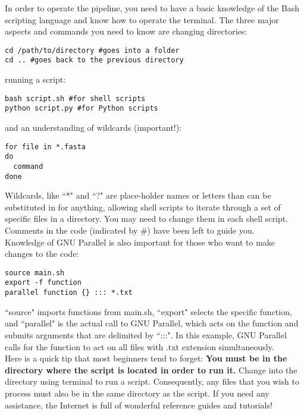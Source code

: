 \documentclass[12pt,titlepage]{article}
\begin{document}
In order to operate the pipeline, you need to have a basic knowledge of the Bash scripting language and know how to operate the terminal. The three major aspects and commands you need to know are changing directories:
\begin{tcolorbox}
\begin{lstlisting}
cd /path/to/directory #goes into a folder
cd .. #goes back to the previous directory 
\end{lstlisting}
\end{tcolorbox}
\noindent running a script:
\begin{tcolorbox}
\begin{lstlisting}
bash script.sh #for shell scripts
python script.py #for Python scripts
\end{lstlisting}
\end{tcolorbox}
\noindent and an understanding of wildcards (important!):
\begin{tcolorbox}
\begin{lstlisting}
for file in *.fasta
do
  command
done
\end{lstlisting}
\end{tcolorbox}
\noindent Wildcards, like ``*" and ``?" are place-holder names or letters than can be substituted in for anything, allowing shell scripts to iterate through a set of specific files in a directory. You may need to change them in each shell script. Comments in the code (indicated by \#) have been left to guide you.\\

Knowledge of GNU Parallel is also important for those who want to make changes to the code:
\begin{tcolorbox}
\begin{lstlisting}
source main.sh	
export -f function 
parallel function {} ::: *.txt 
\end{lstlisting}
\end{tcolorbox}
\noindent ``source" imports functions from main.sh, ``export" selects the specific function, and ``parallel" is the actual call to GNU Parallel, which acts on the function and submits arguments that are delimited by ``:::". In this example, GNU Parallel calls for the function to act on all files with .txt extension simultaneously. \\
Here is a quick tip that most beginners tend to forget: \textbf{You must be in the directory where the script is located in order to run it.} Change into the directory using terminal to run a script. Consequently, any files that you wish to process must also be in the same directory as the script. If you need any assistance, the Internet is full of wonderful reference guides and tutorials!
\end{document}
